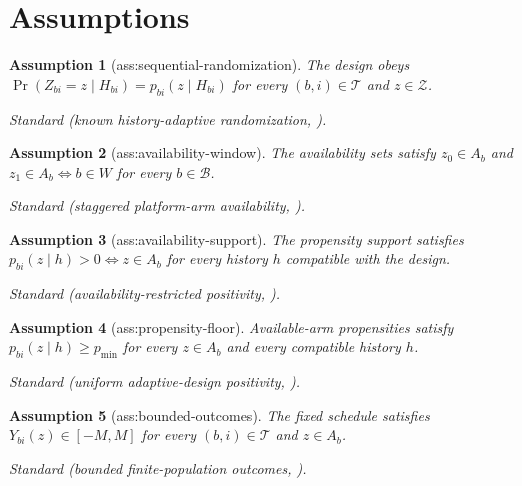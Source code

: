 \documentclass{article}
\newtheorem{assumption}{Assumption}
\begin{document}
\section{Assumptions}

\begin{assumption}[ass:sequential-randomization]\label{ass:sequential-randomization}
The design obeys \(\Pr(Z_{bi}=z\mid H_{bi})=p_{bi}(z\mid H_{bi})\) for every \((b,i)\in\mathcal T\) and \(z\in\mathcal Z\).
\par\smallskip\noindent\emph{Standard} (known history-adaptive randomization, \cite{LiZhao2026}).
\end{assumption}

\begin{assumption}[ass:availability-window]\label{ass:availability-window}
The availability sets satisfy \(z_0\in A_b\) and \(z_1\in A_b\Longleftrightarrow b\in W\) for every \(b\in\mathcal B\).
\par\smallskip\noindent\emph{Standard} (staggered platform-arm availability, \cite{BofillRoigEtAl2022}).
\end{assumption}

\begin{assumption}[ass:availability-support]\label{ass:availability-support}
The propensity support satisfies \(p_{bi}(z\mid h)>0\Longleftrightarrow z\in A_b\) for every history \(h\) compatible with the design.
\par\smallskip\noindent\emph{Standard} (availability-restricted positivity, \cite{SantacatterinaEtAl2025}).
\end{assumption}

\begin{assumption}[ass:propensity-floor]\label{ass:propensity-floor}
Available-arm propensities satisfy \(p_{bi}(z\mid h)\ge p_{\min}\) for every \(z\in A_b\) and every compatible history \(h\).
\par\smallskip\noindent\emph{Standard} (uniform adaptive-design positivity, \cite{LiZhao2026}).
\end{assumption}

\begin{assumption}[ass:bounded-outcomes]\label{ass:bounded-outcomes}
The fixed schedule satisfies \(Y_{bi}(z)\in[-M,M]\) for every \((b,i)\in\mathcal T\) and \(z\in A_b\).
\par\smallskip\noindent\emph{Standard} (bounded finite-population outcomes, \cite{AronowLopatto2026}).
\end{assumption}
\end{document}
